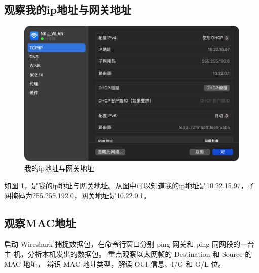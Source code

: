 \documentclass[a4paper,12pt]{report}
\begin{document}
\begin{spacing}{1.5}
\subsection{观察我的ip地址与网关地址}
\begin{figure}[h!]
  \centering
\includegraphics[width=12cm]{figure/my_ip.png}
\caption{我的ip地址与网关地址}
\label{pic1}
\end{figure}

如图 \ref{pic1}，是我的ip地址与网关地址。从图中可以知道我的ip地址是10.22.15.97，子网掩码为255.255.192.0，网关地址是10.22.0.1。

\subsection{观察MAC地址}
启动 Wireshark 捕捉数据包，在命令行窗口分别 ping 网关和 ping 同网段的一台主 机，分析本机发出的数据包。
重点观察以太网帧的 Destination 和 Source 的 MAC 地址， 辨识 MAC 地址类型，解读 OUI 信息、I/G 和 G/L 位。


\end{spacing}
\end{document}
